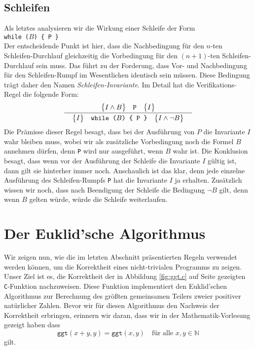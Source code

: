 \subsection{Schleifen}
Als letztes analysieren wir die Wirkung einer Schleife der Form 
\\[0.2cm]
\hspace*{1.3cm}
\texttt{while ($B$) \{ P \}} 
\\[0.2cm]
Der entscheidende Punkt ist hier, dass die Nachbedingung f\"ur den $n$-ten
Schleifen-Durchlauf gleichzeitig die Vorbedingung f\"ur den $(n\!+\!1)$-ten Schleifen-Durchlauf
sein muss.  Das f\"uhrt zu der Forderung, dass Vor- und Nachbedingung f\"ur den
Schleifen-Rumpf im Wesentlichen identisch sein m\"ussen.  Diese Bedingung tr\"agt daher den
Namen \emph{Schleifen-Invariante}.  Im Detail hat die Verifikations-Regel die folgende Form:
\[ 
  \bruch{\hoare{I \wedge B}{P}{I}}{\quad \hoare{I}{while ($B$) \{ P \}}{I \wedge \neg B}\quad}
\]
Die Pr\"amisse dieser Regel besagt, dass bei der Ausf\"uhrung von $P$ die Invariante $I$
wahr bleiben muss, wobei wir als zus\"atzliche Vorbedingung noch die Formel $B$ annehmen
d\"urfen, denn \texttt{P} wird  nur ausgef\"uhrt, wenn $B$ wahr ist.
Die Konklusion besagt, dass wenn vor der Ausf\"uhrung der Schleife die Invariante $I$ g\"ultig
ist, dann gilt sie hinterher immer noch.  Anschaulich ist das klar, denn jede einzelne
Ausf\"uhrung des Schleifen-Rumpfs \texttt{P} hat die Invariante $I$ ja erhalten.
Zus\"atzlich wissen wir noch, dass nach Beendigung der Schleife die Bedingung $\neg B$ gilt,
denn wenn $B$ gelten w\"urde, w\"urde die Schleife weiterlaufen.


\section{Der Euklid'sche Algorithmus}
Wir zeigen nun, wie die im letzten Abschnitt pr\"asentierten Regeln verwendet werden k\"onnen,
um die Korrektheit eines nicht-trivialen Programms zu zeigen.  Unser Ziel ist es, die
Korrektheit der in Abbildung \ref{fig:ggt.c} auf Seite \pageref{fig:ggt.c} gezeigten
\texttt{C}-Funktion nachzuweisen.  Diese Funktion implementiert den Euklid'schen
Algorithmus zur Berechnung des gr\"o{\ss}ten gemeinsamen Teilers zweier positiver nat\"urlicher
Zahlen.  Bevor wir f\"ur diesen Algorithmus den Nachweis der Korrektheit
erbringen, erinnern wir daran, dass wir in der Mathematik-Vorlesung gezeigt haben dass
\[ \texttt{ggt}(x + y, y) = \texttt{ggt}(x,y) \quad \mbox{f\"ur alle $x, y \in \mathbb{N}$} \]  
gilt.


